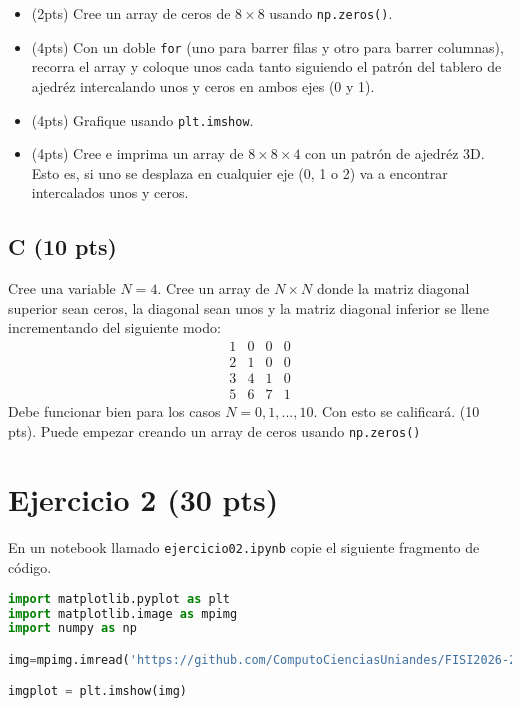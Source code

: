 \documentclass{article}
\begin{document}
\begin{itemize}
\item (2pts) Cree un array de ceros de $8 \times 8$ usando \texttt{np.zeros()}.
\item (4pts) Con un doble \texttt{for} (uno para barrer filas y otro para barrer columnas),
  recorra el array y coloque unos cada tanto siguiendo el patrón del tablero de ajedréz
  intercalando unos y ceros en ambos ejes (0 y 1).
\item (4pts) Grafique usando \texttt{plt.imshow}.
\item (4pts) Cree e imprima un array de $8 \times 8 \times 4$ con un patrón de ajedréz 3D. Esto es,
  si uno se desplaza en cualquier eje (0, 1 o 2) va a encontrar intercalados unos y ceros.
\end{itemize}

\subsection{C (10 pts)}
Cree una variable $N=4$.
Cree un array de $N \times N$ donde la matriz diagonal superior sean ceros, la diagonal
sean unos y la matriz diagonal inferior se llene incrementando del siguiente modo:
\begin{equation}
  \begin{array}{cccc}
    1 & 0 & 0 & 0 \\
    2 & 1 & 0 & 0 \\
    3 & 4 & 1 & 0 \\
    5 & 6 & 7 & 1
  \end{array}  
\end{equation}
Debe funcionar bien para los casos $N=0, 1, ..., 10$. Con esto se calificará. (10 pts).
Puede empezar creando un array de ceros usando \texttt{np.zeros()}

\section{Ejercicio 2 (30 pts)}
En un notebook llamado \texttt{ejercicio02.ipynb} copie el siguiente fragmento de código.

\begin{lstlisting}[language=Python, caption=grafica-cos.py]
import matplotlib.pyplot as plt
import matplotlib.image as mpimg
import numpy as np

img=mpimg.imread('https://github.com/ComputoCienciasUniandes/FISI2026-201910/raw/master/Talleres/Grupo_1/sorpresa_hubble.png')

imgplot = plt.imshow(img)
\end{lstlisting}
\end{document}
